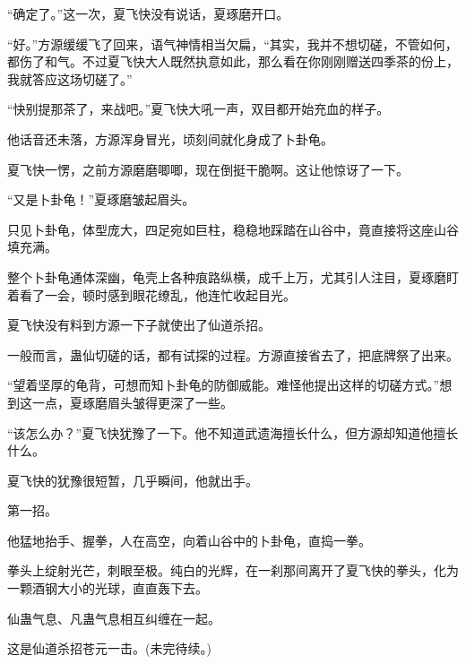 \begin{this_body}
“确定了。”这一次，夏飞快没有说话，夏琢磨开口。

“好。”方源缓缓飞了回来，语气神情相当欠扁，“其实，我并不想切磋，不管如何，都伤了和气。不过夏飞快大人既然执意如此，那么看在你刚刚赠送四季茶的份上，我就答应这场切磋了。”

“快别提那茶了，来战吧。”夏飞快大吼一声，双目都开始充血的样子。

他话音还未落，方源浑身冒光，顷刻间就化身成了卜卦龟。

夏飞快一愣，之前方源磨磨唧唧，现在倒挺干脆啊。这让他惊讶了一下。

“又是卜卦龟！”夏琢磨皱起眉头。

只见卜卦龟，体型庞大，四足宛如巨柱，稳稳地踩踏在山谷中，竟直接将这座山谷填充满。

整个卜卦龟通体深幽，龟壳上各种痕路纵横，成千上万，尤其引人注目，夏琢磨盯着看了一会，顿时感到眼花缭乱，他连忙收起目光。

夏飞快没有料到方源一下子就使出了仙道杀招。

一般而言，蛊仙切磋的话，都有试探的过程。方源直接省去了，把底牌祭了出来。

“望着坚厚的龟背，可想而知卜卦龟的防御威能。难怪他提出这样的切磋方式。”想到这一点，夏琢磨眉头皱得更深了一些。

“该怎么办？”夏飞快犹豫了一下。他不知道武遗海擅长什么，但方源却知道他擅长什么。

夏飞快的犹豫很短暂，几乎瞬间，他就出手。

第一招。

他猛地抬手、握拳，人在高空，向着山谷中的卜卦龟，直捣一拳。

拳头上绽射光芒，刺眼至极。纯白的光辉，在一刹那间离开了夏飞快的拳头，化为一颗酒钢大小的光球，直直轰下去。

仙蛊气息、凡蛊气息相互纠缠在一起。

这是仙道杀招苍元一击。(未完待续。)

\end{this_body}

